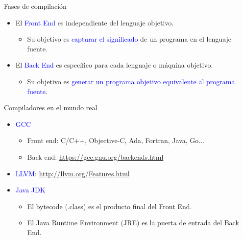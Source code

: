 \documentclass{beamer} %
\newcommand{\blue}[1]{\textcolor{blue}{#1}}
\begin{document}
\begin{frame}{Fases de compilación}
    \begin{itemize}
        \item<1-> El \blue{Front End} es independiente del lenguaje objetivo.
        \begin{itemize}
            \item Su objetivo es \blue{capturar el significado} de un programa en el lenguaje fuente.
        \end{itemize}
        \item<2-> El \blue{Back End} es específico para cada lenguaje o máquina objetivo.
        \begin{itemize}
            \item Su objetivo es \blue{generar un programa objetivo equivalente al programa fuente}.
        \end{itemize}
    \end{itemize}
\end{frame}

\begin{frame}{Compiladores en el mundo real}
    \begin{itemize}
        \item<1-> \blue{GCC}
        \begin{itemize}
            \item Front end: C/C++, Objective-C, Ada, Fortran, Java, Go...
            \item Back end: \url{https://gcc.gnu.org/backends.html}
        \end{itemize}
        \item<2-> \blue{LLVM}: \url{http://llvm.org/Features.html}
        \item<3-> \blue{Java JDK}
        \begin{itemize}
            \item El bytecode (.class) es el producto final del Front End.
            \item El Java Runtime Environment (JRE) es la puerta de entrada del Back End.
        \end{itemize}
    \end{itemize}
\end{frame}

\end{document}
